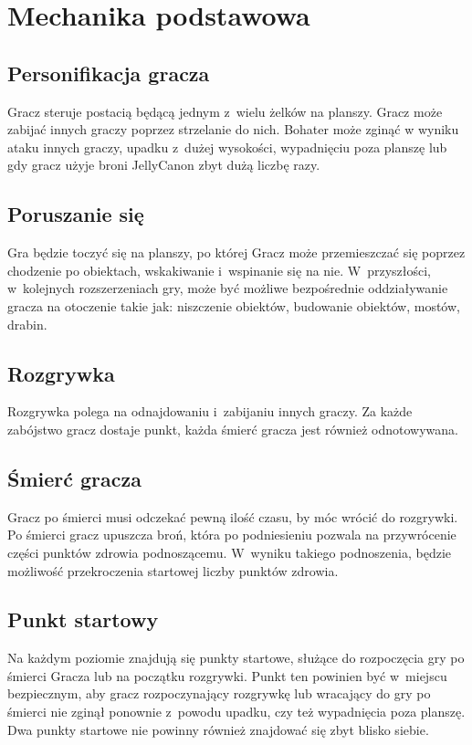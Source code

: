 \chapter{Mechanika podstawowa}

\section{Personifikacja gracza}
Gracz steruje postacią będącą jednym z~wielu żelków na planszy. Gracz może zabijać innych graczy poprzez strzelanie do nich. Bohater może zginąć w wyniku ataku innych graczy, upadku z~dużej wysokości, wypadnięciu poza planszę lub gdy gracz użyje broni JellyCanon zbyt dużą liczbę razy. 

\section{Poruszanie się}
Gra będzie toczyć się na planszy, po której Gracz może przemieszczać się poprzez chodzenie po obiektach, wskakiwanie i~wspinanie się na nie. 
W~przyszłości, w~kolejnych rozszerzeniach gry, może być możliwe bezpośrednie oddziaływanie gracza na otoczenie takie jak: niszczenie obiektów, budowanie obiektów, mostów, drabin.

\section{Rozgrywka}
Rozgrywka polega na odnajdowaniu i~zabijaniu innych graczy. Za każde zabójstwo gracz dostaje punkt, każda śmierć gracza jest również odnotowywana.

\section{Śmierć gracza}
Gracz po śmierci musi odczekać pewną ilość czasu, by móc wrócić do rozgrywki. Po śmierci gracz upuszcza broń, która po podniesieniu pozwala na przywrócenie części punktów zdrowia podnoszącemu. W~wyniku takiego podnoszenia, będzie możliwość przekroczenia startowej liczby punktów zdrowia.

\section{Punkt startowy}
Na każdym poziomie znajdują się punkty startowe, służące do rozpoczęcia gry po śmierci Gracza lub na początku rozgrywki. Punkt ten powinien być w~miejscu bezpiecznym, aby gracz rozpoczynający rozgrywkę lub wracający do gry po śmierci nie zginął ponownie z~powodu upadku, czy też wypadnięcia poza planszę. Dwa punkty startowe nie powinny również znajdować się zbyt blisko siebie.

